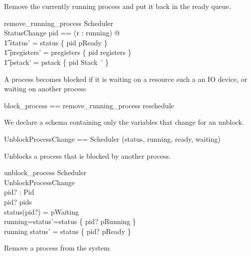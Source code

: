 \documentclass{article}
\begin{document}
Remove the currently running process and put it back in the ready queue.

\begin{schema}{remove\_running\_process}
  \Delta Scheduler\\
  \Xi StatusChange
\where
  \exists pid == (\mu r : running) @\\
    \t1 status' = status \oplus \{ pid \mapsto pReady \} \land\\
    \t1 pregisters' = pregisters \oplus \{ pid \mapsto registers \} \land\\
    \t1 pstack' = pstack \oplus \{ pid \mapsto \theta Stack~' \}
\end{schema}

A process becomes blocked if it is waiting on a resource such a an IO
device, or waiting on another process 

\begin{zed}
  block\_process == remove\_running\_process \semi reschedule
\end{zed}

We declare a schema containing only the variables that change for an
unblock.

\begin{zed}
  UnblockProcessChange == Scheduler \hide (status, running, ready, waiting)
\end{zed}

Unblocks a process that is blocked by another process.

\begin{schema}{unblock\_process}
  \Delta Scheduler\\
  \Xi UnblockProcessChange\\
  pid? : Pid\\
\where
  pid? \in pids\\
  status(pid?) = pWaiting\\
  running=\emptyset \iff status'=status \oplus \{ pid? \mapsto pRunning \}\\
  running \neq \emptyset \iff status' = status \oplus \{ pid? \mapsto pReady \}
\end{schema}

Remove a process from the system
\end{document}
